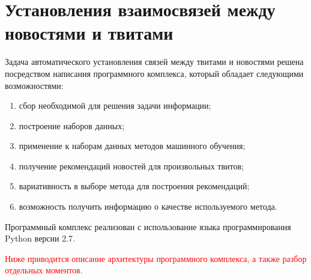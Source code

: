 \section{Установления взаимосвязей между новостями и твитами}
    Задача автоматического установления связей между твитами и новостями решена посредством написания программного комплекса,
    который обладает следующими возможностями:
    \begin{enumerate}
        \item сбор необходимой для решения задачи информации;
        \item построение наборов данных;
        \item применение к наборам данных методов машинного обучения;
        \item получение рекомендаций новостей для произвольных твитов;
        \item вариативность в выборе метода для построения рекомендаций;
        \item возможность получить информацию о качестве используемого метода.
    \end{enumerate}
    Программный комплекс реализован с использование языка программирования Python версии 2.7.

    \textcolor{red}{Ниже приводится описание архитектуры программного комплекса, а также разбор отдельных моментов.}

    
    
    
    
    

